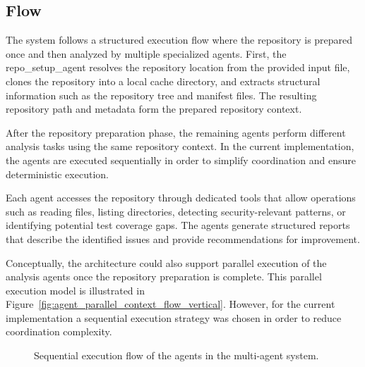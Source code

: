 \documentclass[conference]{IEEEtran}
\begin{document}
\subsection{Flow}
The system follows a structured execution flow where the repository is prepared once and then analyzed by multiple specialized agents.
First, the repo\_setup\_agent resolves the repository location from the provided input file, clones the repository into a local cache directory, and extracts structural information such as the repository tree and manifest files. The resulting repository path and metadata form the prepared repository context.


After the repository preparation phase, the remaining agents perform different analysis tasks using the same repository context. In the current implementation, the agents are executed sequentially in order to simplify coordination and ensure deterministic execution.


Each agent accesses the repository through dedicated tools that allow operations such as reading files, listing directories, detecting security-relevant patterns, or identifying potential test coverage gaps. The agents generate structured reports that describe the identified issues and provide recommendations for improvement.


Conceptually, the architecture could also support parallel execution of the analysis agents once the repository preparation is complete. This parallel execution model is illustrated in Figure~\ref{fig:agent_parallel_context_flow_vertical}. However, for the current implementation a sequential execution strategy was chosen in order to reduce coordination complexity.

\begin{figure}[htbp]
	\centering
	\caption{Sequential execution flow of the agents in the multi-agent system.} 
	\label{fig:agent_flow}
\end{figure}
\end{document}
